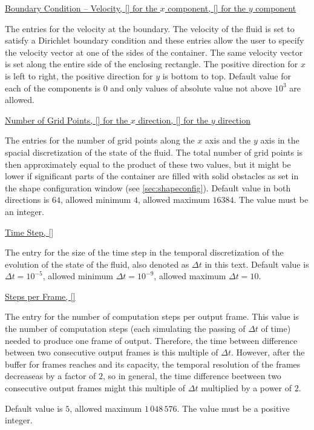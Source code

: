 \documentclass{article}
\newcommand{\vxlisp}{\vspace*{12pt}}
\begin{document}
\underline{Boundary Condition -- Velocity, [\numvx] for the $x$ component, [\numvy] for the $y$ component}
\undrsep

The entries for the velocity at the boundary. The velocity of the fluid is set to satisfy a Dirichlet boundary condition and these entries allow the user to specify the velocity vector at one of the sides of the container. The same velocity vector is set along the entire side of the enclosing rectangle. The positive direction for $x$ is left to right, the positive direction for $y$ is bottom to top. Default value for each of the components is $0$ and only values of absolute value not above $10^3$ are allowed.
\vxlisp

\underline{Number of Grid Points, [\numwp] for the $x$ direction, [\numhp] for the $y$ direction}
\undrsep

The entries for the number of grid points along the $x$ axis and the $y$ axis in the spacial discretization of the state of the fluid. The total number of grid points is then approximately equal to the product of these two values, but it might be lower if significant parts of the container are filled with solid obstacles as set in the shape configuration window (see \ref{sec:shapeconfig}). Default value in both directions is $64$, allowed minimum $4$, allowed maximum $16384$. The value must be an integer.
\vxlisp

\underline{Time Step, [\numdt]}
\undrsep
\newcommand{\dt}{\Delta t}

The entry for the size of the time step in the temporal discretization of the evolution of the state of the fluid, also denoted as $\dt$ in this text. Default value is $\dt=10^{-5}$, allowed minimum $\dt=10^{-9}$, allowed maximum $\dt=10$.
\vxlisp

\underline{Steps per Frame, [\numsteps]}
\undrsep

The entry for the number of computation steps per output frame. This value is the number of computation steps (each simulating the passing of $\Delta t$ of time) needed to produce one frame of output. Therefore, the time between difference between two consecutive output frames is this multiple of $\Delta t$. However, after the buffer for frames reaches and its capacity, the temporal resolution of the frames decreaseas by a factor of $2$, so in general, the time difference beetween two consecutive output frames might this multiple of $\Delta t$ multiplied by a power of $2$.
\vxlisp

Default value is $5$, allowed maximum $1\,048\,576$. The value must be a positive integer.
\vxlisp
\end{document}
